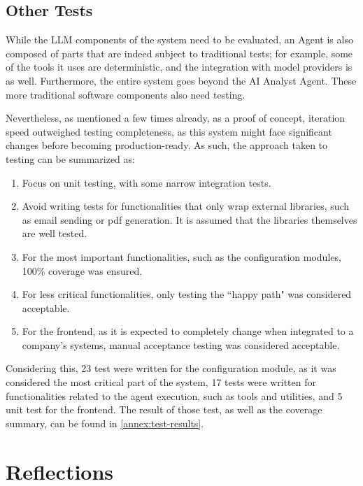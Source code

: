 \documentclass[a4paper]{report}
\begin{document}
\section{Other Tests}
\label{sec:other-tests}

While the LLM components of the system need to be evaluated, an Agent is also composed of parts that are indeed subject to traditional tests; for example, some of the tools it uses are deterministic, and the integration with model providers is as well. Furthermore, the entire system goes beyond the AI Analyst Agent. These more traditional software components also need testing.

Nevertheless, as mentioned a few times already, as a proof of concept, iteration speed outweighed testing completeness, as this system might face significant changes before becoming production-ready. As such, the approach taken to testing can be summarized as:

\begin{enumerate}
    \item Focus on unit testing, with some narrow integration tests.
    \item Avoid writing tests for functionalities that only wrap external libraries, such as email sending or pdf generation. It is assumed that the libraries themselves are well tested.
    \item For the most important functionalities, such as the configuration modules, 100\% coverage was ensured.
    \item For less critical functionalities, only testing the ``happy path" was considered acceptable.
    \item For the frontend, as it is expected to completely change when integrated to a company's systems, manual acceptance testing was considered acceptable.
\end{enumerate}

Considering this, 23 test were written for the configuration module, as it was considered the most critical part of the system, 17 tests were written for functionalities related to the agent execution, such as tools and utilities, and 5 unit test for the frontend. The result of those test, as well as the coverage summary, can be found in \autoref{annex:test-results}.

\chapter{Reflections}
\label{chapter:reflections}
\end{document}
